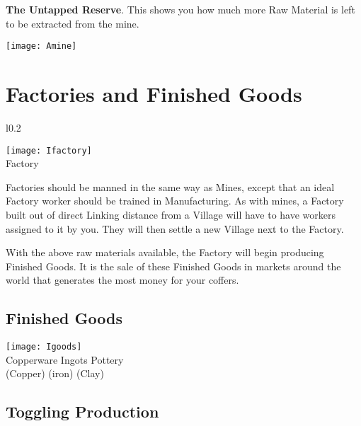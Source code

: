 \textbf{The Untapped Reserve}. This shows you how much more Raw Material is left to be extracted from the mine.

\begin{center}
	\texttt{[image: Amine]}
\end{center}

\section{Factories and Finished Goods}

\begin{wrapfigure}{l}{0.2\textwidth}
	\vspace{-20pt}
	\begin{center}
		\texttt{[image: Ifactory]}
		\\ Factory
	\end{center}
	\vspace{-20pt}
\end{wrapfigure}

Factories should be manned in the same way as Mines, except that an ideal Factory worker should be trained in Manufacturing. As with mines, a Factory built out of direct Linking distance from a Village will have to have workers assigned to it by you. They will then settle a new Village next to the Factory.

With the above raw materials available, the Factory will begin producing Finished Goods. It is the sale of these Finished Goods in markets around the world that generates the most money for your coffers.

\subsection{Finished Goods}


\begin{center}
	\texttt{[image: Igoods]}
	\\ Copperware Ingots Pottery
	\\ (Copper) (iron) (Clay)
\end{center}

\clearpage

\subsection{Toggling Production}

